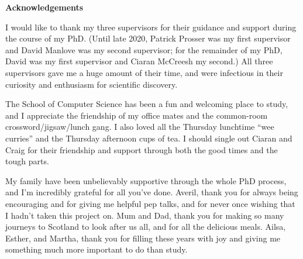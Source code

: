 \vspace*{1.75in}

\begin{center} {\bf Acknowledgements}\end{center}

I would like to thank my three supervisors for their guidance and support during the course of my PhD.  (Until late 2020, Patrick Prosser was my first supervisor and David Manlove was my second supervisor; for the remainder of my PhD, David was my first supervisor and Ciaran McCreesh my second.)  All three supervisors gave me a huge amount of their time, and were infectious in their curiosity and enthusiasm for scientific discovery.

The School of Computer Science has been a fun and welcoming place to study, and I appreciate the friendship of my office mates and the common-room crossword/jigsaw/lunch gang.
I also loved all the Thursday lunchtime ``wee curries'' and the Thursday afternoon cups of tea.
I should single out Ciaran and Craig for their friendship and support through both the good times and the tough parts.

My family have been unbelievably supportive through the whole PhD process, and I'm incredibly grateful for all you've done. Averil, thank you for always being encouraging and for giving me helpful pep talks, and for never once wishing that I hadn't taken this project on. Mum and Dad, thank you for making so many journeys to Scotland to look after us all, and for all the delicious meals. Ailsa, Esther, and Martha, thank you for filling these years with joy and giving me something much more important to do than study.
